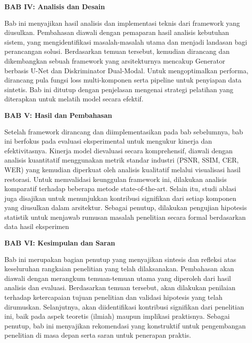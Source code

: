 \documentclass[12pt,a4paper]{article}
\begin{document}
\vspace{0.5em}
\textbf{BAB IV: Analisis dan Desain}

Bab ini menyajikan hasil analisis dan implementasi teknis dari framework yang diusulkan. Pembahasan diawali dengan pemaparan hasil analisis kebutuhan sistem, yang mengidentifikasi masalah-masalah utama dan menjadi landasan bagi perancangan solusi. Berdasarkan temuan tersebut, kemudian dirancang dan dikembangkan sebuah framework yang arsitekturnya mencakup Generator berbasis U-Net dan Diskriminator Dual-Modal. Untuk mengoptimalkan performa, dirancang pula fungsi loss multi-komponen serta pipeline untuk penyiapan data sintetis. Bab ini ditutup dengan penjelasan mengenai strategi pelatihan yang diterapkan untuk melatih model secara efektif.

\vspace{0.5em}
\textbf{BAB V: Hasil dan Pembahasan}

Setelah framework dirancang dan diimplementasikan pada bab sebelumnya, bab ini berfokus pada evaluasi eksperimental untuk mengukur kinerja dan efektivitasnya. Kinerja model dievaluasi secara komprehensif, diawali dengan analisis kuantitatif menggunakan metrik standar industri (PSNR, SSIM, CER, WER) yang kemudian diperkuat oleh analisis kualitatif melalui visualisasi hasil restorasi. Untuk memvalidasi keunggulan framework ini, dilakukan analisis komparatif terhadap beberapa metode state-of-the-art. Selain itu, studi ablasi juga disajikan untuk menunjukkan kontribusi signifikan dari setiap komponen yang diusulkan dalam arsitektur. Sebagai penutup, dilakukan pengujian hipotesis statistik untuk menjawab rumusan masalah penelitian secara formal berdasarkan data hasil eksperimen

\vspace{0.5em}
\textbf{BAB VI: Kesimpulan dan Saran}

Bab ini merupakan bagian penutup yang menyajikan sintesis dan refleksi atas keseluruhan rangkaian penelitian yang telah dilaksanakan. Pembahasan akan diawali dengan merangkum temuan-temuan utama yang diperoleh dari hasil analisis dan evaluasi. Berdasarkan temuan tersebut, akan dilakukan penilaian terhadap ketercapaian tujuan penelitian dan validasi hipotesis yang telah dirumuskan. Selanjutnya, akan diidentifikasi kontribusi signifikan dari penelitian ini, baik pada aspek teoretis (ilmiah) maupun implikasi praktisnya. Sebagai penutup, bab ini menyajikan rekomendasi yang konstruktif untuk pengembangan penelitian di masa depan serta saran untuk penerapan praktis.


\end{document}
